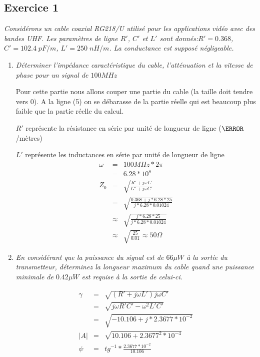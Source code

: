 \subsection{Exercice 1}
\textit{Considérons un cable coaxial RG218/U utilisé pour les
applications vidéo avec des bandes UHF\@. Les paramètres de ligne
$R'$, $C'$ et $L'$ sont donnés:$R' = 0.368$, $C'=102.4 \;pF/m$, $L'=250 \;nH/m$. La conductance est supposé négligeable.}
\begin{enumerate}
	\item \textit{Déterminer l'impédance caractéristique du cable, l'atténuation et la vitesse de phase pour un signal de $100 MHz$}

	\begin{framed}
	Pour cette partie nous allons couper une partie du cable (la
	taille doit tendre vers 0). A la ligne (5) on se débarasse de la
	partie réelle qui est beaucoup plus faible que la partie réelle
	du calcul.

	$R'$ représente la résistance en série par unité de longueur de
	ligne ($\ohm$/mètres)

	$L'$ représente les inductances en série par unité de longueur
	de ligne
	\begin{eqnarray*}
		\omega &=&100MHz * 2\pi\\
		&=& 6.28*10^8\\
		Z_0 &=& \sqrt{\frac{R'+j\omega L'}{G' + j\omega C'}}\\
		&=& \sqrt{\frac{0.368 + j * 6.28 * 25}{j*6.28 * 0.01024}} \\
		&\approx& \sqrt{\frac{j * 6.28 * 25}{j*6.28 * 0.01024}}\\
		&\approx& \sqrt{\frac{25}{0.01}} \approx 50 \Omega
	\end{eqnarray*}
	\end{framed}

	\item \textit{En considérant que la puissance du signal est de $66\mu W$ à la sortie du transmetteur, déterminez la longueur maximum du cable quand une puissance minimale de $0.42\mu W$ est requise à la sortie de celui-ci.}
	\begin{framed}
	\begin{eqnarray*}
		\gamma &=& \sqrt{(R' + j\omega L')j \omega C'} \\
		&=& \sqrt{j\omega R' C' - \omega^2 L' C'} \\
		&=& \sqrt{-10.106 + j*2.3677 * 10^{-2}} \\
		|A| &=& \sqrt{10.106+2.3677^2*10^{-4}} \\
		\psi &=& tg^{-1} * \frac{2.3677*10^{-2}}{10.106}
	\end{eqnarray*}
	\end{framed}

\end{enumerate}

